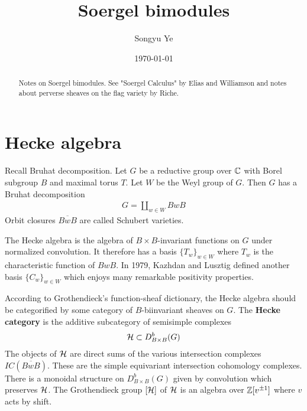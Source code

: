 \documentclass[12pt]{article}
\begin{document}
\rhead{\today}
\cfoot{\thepage}

\title{Soergel bimodules}

\author{Songyu Ye}
\date{\today}
\maketitle


\begin{abstract}
Notes on Soergel bimodules. See "Soergel Calculus" by Elias and Williamson and notes about 
perverse sheaves on the flag variety by Riche.
\end{abstract}

\tableofcontents
\section{Hecke algebra}
Recall Bruhat decomposition. Let $G$ be a reductive group over $\mathbb{C}$ 
with Borel subgroup $B$ and maximal torus $T$. 
Let $W$ be the Weyl group of $G$. Then $G$ has a Bruhat decomposition
\begin{align*}
G = \coprod_{w\in W} BwB
\end{align*} Orbit closures $\overline{BwB}$ are called Schubert varieties.

\hfill

The Hecke algebra is the algebra of $B\times B$-invariant functions on $G$ under
normalized convolution. It therefore has a basis $\{T_w\}_{w\in W}$ where $T_w$ is the 
characteristic function of $BwB$. In 1979, Kazhdan and Lusztig defined another basis $\{C_w\}_{w\in W}$
which enjoys many remarkable positivity properties.

\hfill 

According to Grothendieck's function-sheaf dictionary, the Hecke 
algebra should be categorified by some category of $B$-biinvariant sheaves on $G$.
The \textbf{Hecke category} is the additive subcategory of semisimple complexes \begin{align*}
    {\mathcal{H}} \subset D^b_{B\times B}(G)
\end{align*} The objects of ${\mathcal{H}}$ are direct sums of 
the various intersection complexes $IC(\overline{BwB})$. These are the simple equivariant
intersection cohomology complexes. There is a monoidal structure on $D^b_{B\times B}(G)$
 given by convolution which preserves ${\mathcal{H}}$. The Grothendieck group $[{\mathcal{H}}]$ of ${\mathcal{H}}$ is an algebra 
 over $\mathbb{Z}[v^{\pm 1}]$ where $v$ acts by shift. 
 
\end{document}
